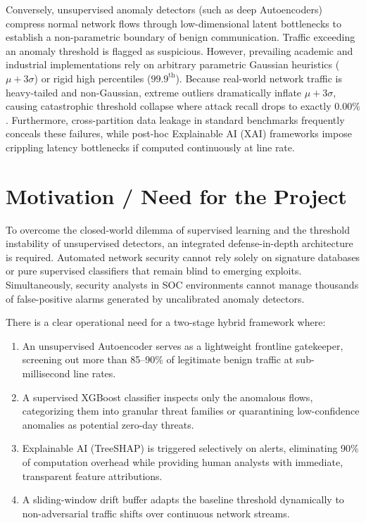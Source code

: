 \documentclass[12pt,a4paper]{report}
\begin{document}
Conversely, unsupervised anomaly detectors (such as deep Autoencoders) compress normal network flows through low-dimensional latent bottlenecks to establish a non-parametric boundary of benign communication. Traffic exceeding an anomaly threshold is flagged as suspicious. However, prevailing academic and industrial implementations rely on arbitrary parametric Gaussian heuristics ($\mu + 3\sigma$) or rigid high percentiles ($99.9^{\text{th}}$). Because real-world network traffic is heavy-tailed and non-Gaussian, extreme outliers dramatically inflate $\mu + 3\sigma$, causing catastrophic threshold collapse where attack recall drops to exactly $0.00\%$. Furthermore, cross-partition data leakage in standard benchmarks frequently conceals these failures, while post-hoc Explainable AI (XAI) frameworks impose crippling latency bottlenecks if computed continuously at line rate.

\section{Motivation / Need for the Project}
To overcome the closed-world dilemma of supervised learning and the threshold instability of unsupervised detectors, an integrated defense-in-depth architecture is required. Automated network security cannot rely solely on signature databases or pure supervised classifiers that remain blind to emerging exploits. Simultaneously, security analysts in SOC environments cannot manage thousands of false-positive alarms generated by uncalibrated anomaly detectors.

There is a clear operational need for a two-stage hybrid framework where:
\begin{enumerate}
    \item An unsupervised Autoencoder serves as a lightweight frontline gatekeeper, screening out more than 85--90\% of legitimate benign traffic at sub-millisecond line rates.
    \item A supervised XGBoost classifier inspects only the anomalous flows, categorizing them into granular threat families or quarantining low-confidence anomalies as potential zero-day threats.
    \item Explainable AI (TreeSHAP) is triggered selectively on alerts, eliminating 90\% of computation overhead while providing human analysts with immediate, transparent feature attributions.
    \item A sliding-window drift buffer adapts the baseline threshold dynamically to non-adversarial traffic shifts over continuous network streams.
\end{enumerate}
\end{document}
